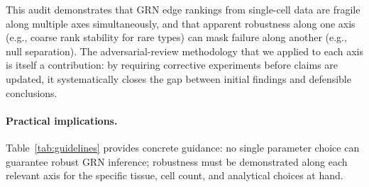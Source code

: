 \documentclass[12pt]{article}
\begin{document}
This audit demonstrates that GRN edge rankings from single-cell data are fragile
along multiple axes simultaneously, and that apparent robustness along one axis
(e.g., coarse rank stability for rare types) can mask failure along another
(e.g., null separation). The adversarial-review methodology that we applied to
each axis is itself a contribution: by requiring corrective experiments before
claims are updated, it systematically closes the gap between initial findings and
defensible conclusions.

\paragraph{Practical implications.}
Table~\ref{tab:guidelines} provides concrete guidance: no single
parameter choice can guarantee robust GRN inference; robustness must
be demonstrated along each relevant axis for the specific tissue,
cell count, and analytical choices at hand.
\end{document}
